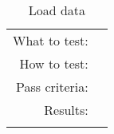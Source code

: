 \begin{table}[H]
  \begin{tabular}{r | p{8cm}}
    \noalign{\smallskip}\hline\noalign{\smallskip}
    
    What to test:  & \\

    \noalign{\smallskip}\hline\noalign{\smallskip}

    How to test:   &  \\

    \noalign{\smallskip}\hline\noalign{\smallskip}

    Pass criteria: &  \\

    \noalign{\smallskip}\hline\noalign{\smallskip}
    
    Results: &  \\
   \noalign{\smallskip}\hline\noalign{\smallskip}
  
  
  
  \end{tabular}
  \caption{Load data}
  \label{testing:fitness:pipeline_test}
\end{table}